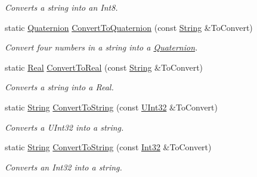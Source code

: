 \begin{DoxyCompactItemize}
\begin{DoxyCompactList}\small\item\em Converts a string into an Int8. \item\end{DoxyCompactList}\item 
static \hyperlink{classMezzanine_1_1Quaternion}{Quaternion} \hyperlink{classMezzanine_1_1StringTool_ae8febfde93224bea0b9891bdfc43bda2}{ConvertToQuaternion} (const \hyperlink{namespaceMezzanine_acf9fcc130e6ebf08e3d8491aebcf1c86}{String} \&ToConvert)
\begin{DoxyCompactList}\small\item\em Convert four numbers in a string into a \hyperlink{classMezzanine_1_1Quaternion}{Quaternion}. \item\end{DoxyCompactList}\item 
static \hyperlink{namespaceMezzanine_a726731b1a7df72bf3583e4a97282c6f6}{Real} \hyperlink{classMezzanine_1_1StringTool_a74e59c6e47dbc8ba08de9a75239d726e}{ConvertToReal} (const \hyperlink{namespaceMezzanine_acf9fcc130e6ebf08e3d8491aebcf1c86}{String} \&ToConvert)
\begin{DoxyCompactList}\small\item\em Converts a string into a Real. \item\end{DoxyCompactList}\item 
static \hyperlink{namespaceMezzanine_acf9fcc130e6ebf08e3d8491aebcf1c86}{String} \hyperlink{classMezzanine_1_1StringTool_ad8cb0a779be5d7805def07a8534c75f6}{ConvertToString} (const \hyperlink{namespaceMezzanine_abea3b8e8e9b03d2547b2800284ba682d}{UInt32} \&ToConvert)
\begin{DoxyCompactList}\small\item\em Converts a UInt32 into a string. \item\end{DoxyCompactList}\item 
static \hyperlink{namespaceMezzanine_acf9fcc130e6ebf08e3d8491aebcf1c86}{String} \hyperlink{classMezzanine_1_1StringTool_a95d8c60bc579bd3f0d6e82f68a8f3cb4}{ConvertToString} (const \hyperlink{namespaceMezzanine_a590a2f3eb4a187e1b25209e546e540e1}{Int32} \&ToConvert)
\begin{DoxyCompactList}\small\item\em Converts an Int32 into a string. \item\end{DoxyCompactList}\item 

\end{DoxyCompactItemize}
